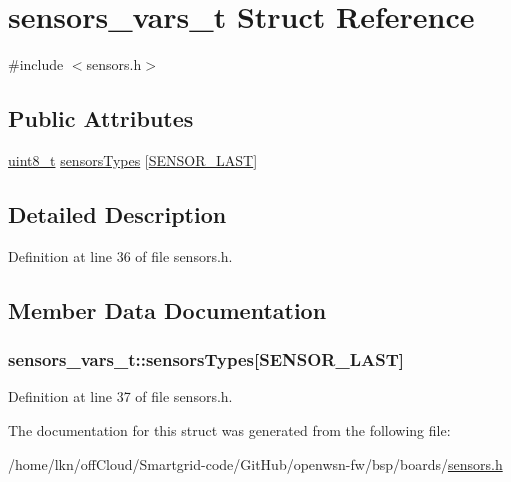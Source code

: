 \hypertarget{structsensors__vars__t}{}\section{sensors\+\_\+vars\+\_\+t Struct Reference}
\label{structsensors__vars__t}


{\ttfamily \#include $<$sensors.\+h$>$}

\subsection*{Public Attributes}
\begin{DoxyCompactItemize}
\item 
\hyperlink{_p_e___types_8h_aba7bc1797add20fe3efdf37ced1182c5}{uint8\+\_\+t} \hyperlink{structsensors__vars__t_a08f623d6335dc9c30be10f390636aa73}{sensors\+Types} \mbox{[}\hyperlink{sensors_8h_a1e8054db89feba236b2235d16d0bd1adaa41a07e65feb6f21b2f95a64c077592c}{S\+E\+N\+S\+O\+R\+\_\+\+L\+A\+ST}\mbox{]}
\end{DoxyCompactItemize}


\subsection{Detailed Description}


Definition at line 36 of file sensors.\+h.



\subsection{Member Data Documentation}
\subsubsection[{\texorpdfstring{sensors\+Types}{sensorsTypes}}]{ sensors\+\_\+vars\+\_\+t\+::sensors\+Types\mbox{[}{\bf S\+E\+N\+S\+O\+R\+\_\+\+L\+A\+ST}\mbox{]}}\hypertarget{structsensors__vars__t_a08f623d6335dc9c30be10f390636aa73}{}\label{structsensors__vars__t_a08f623d6335dc9c30be10f390636aa73}


Definition at line 37 of file sensors.\+h.



The documentation for this struct was generated from the following file\+:\begin{DoxyCompactItemize}
\item 
/home/lkn/off\+Cloud/\+Smartgrid-\/code/\+Git\+Hub/openwsn-\/fw/bsp/boards/\hyperlink{sensors_8h}{sensors.\+h}\end{DoxyCompactItemize}
